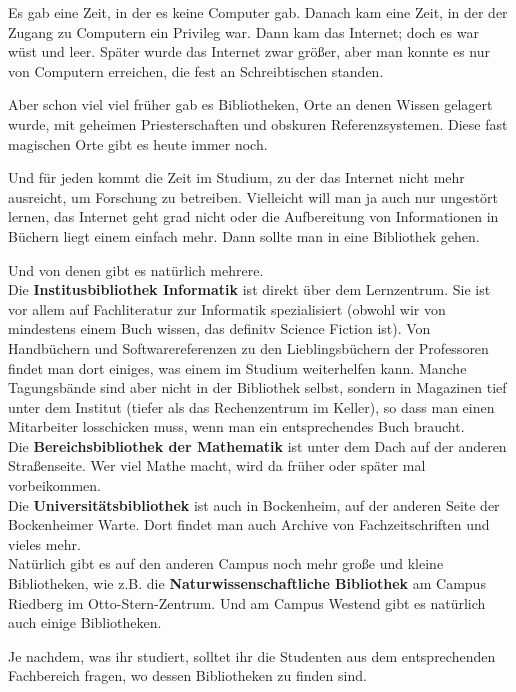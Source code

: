 \spaltenanfang

Es gab eine Zeit, in der es keine Computer gab. Danach kam eine Zeit, in der der Zugang zu Computern ein Privileg war. Dann kam das Internet; doch es war w\"ust und leer. Sp\"ater wurde das Internet zwar gr\"o{\ss}er, aber man konnte es nur von Computern erreichen, die fest an Schreibtischen standen.

Aber schon viel viel fr\"uher gab es Bibliotheken, Orte an denen Wissen gelagert wurde, mit geheimen Priesterschaften und obskuren Referenzsystemen. Diese fast magischen Orte gibt es heute immer noch.

Und f\"ur jeden kommt die Zeit im Studium, zu der das Internet nicht mehr ausreicht, um Forschung zu betreiben. Vielleicht will man ja auch nur ungest\"ort lernen, das Internet geht grad nicht oder die Aufbereitung von Informationen in B\"uchern liegt einem einfach mehr. Dann sollte man in eine Bibliothek gehen.

Und von denen gibt es nat\"urlich mehrere.\\
Die \textbf{Institusbibliothek Informatik} ist direkt \"uber dem Lernzentrum.
Sie ist vor allem auf Fachliteratur zur Informatik spezialisiert (obwohl wir von
mindestens einem Buch wissen, das definitv Science Fiction ist). Von Handb\"uchern und
Softwarereferenzen zu den Lieblingsb\"uchern der Professoren findet man dort
einiges, was einem im Studium weiterhelfen kann. Manche Tagungsb\"ande sind aber nicht in der Bibliothek selbst,
sondern in Magazinen tief unter dem Institut (tiefer als das Rechenzentrum im Keller), so dass man einen Mitarbeiter losschicken muss, wenn man ein entsprechendes Buch braucht.\\
Die \textbf{Bereichsbibliothek der Mathematik} ist unter dem Dach auf der anderen Stra{\ss}enseite. Wer viel Mathe macht, wird da fr\"uher oder sp\"ater mal vorbeikommen.\\
Die \textbf{Universit\"atsbibliothek} ist auch in Bockenheim, auf der anderen Seite der Bockenheimer Warte. Dort findet man auch Archive von Fachzeitschriften und vieles mehr.\\
Nat\"urlich gibt es auf den anderen Campus noch mehr gro{\ss}e und kleine Bibliotheken, wie z.B. die \textbf{Naturwissenschaftliche Bibliothek} am Campus Riedberg im Otto-Stern-Zentrum. Und am Campus Westend gibt es natürlich auch einige Bibliotheken.

Je nachdem, was ihr studiert, solltet ihr die Studenten aus dem entsprechenden Fachbereich fragen, wo dessen Bibliotheken zu finden sind.

